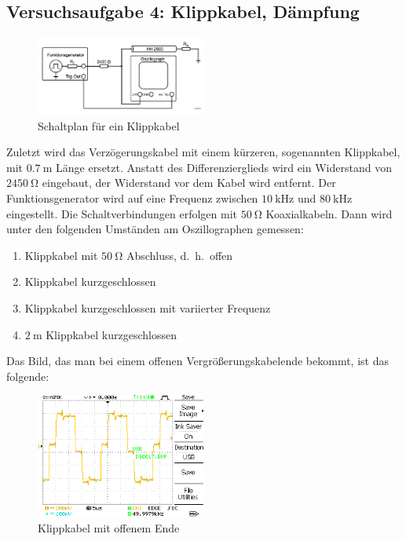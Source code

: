 \documentclass{article}
\begin{document}
\subsection{Versuchsaufgabe 4: Klippkabel, Dämpfung}
			\begin{figure}[H]
				\centering
				\includegraphics[width=0.5\textwidth]{figs/Aufbau_1_4_Klippkabel.png}
				\caption{Schaltplan für ein Klippkabel~\cite{anleitung}}
				\label{fig:aufbau_1_4_klippkabel}
			\end{figure}
			Zuletzt wird das Verzögerungskabel mit einem kürzeren, sogenannten Klippkabel, mit $\SI{0.7}{\meter}$ Länge ersetzt. Anstatt des Differenzierglieds wird ein Widerstand von $\SI{2450}{\ohm}$ eingebaut, der Widerstand vor dem Kabel wird entfernt. Der Funktionsgenerator wird auf eine Frequenz zwischen $\SI{10}{\kilo\hertz}$ und $\SI{80}{\kilo\hertz}$ eingestellt. Die Schaltverbindungen erfolgen mit $\SI{50}{\ohm}$ Koaxialkabeln. Dann wird unter den folgenden Umständen am Oszillographen gemessen:
			\begin{enumerate}[label=\alph*]
				\item Klippkabel mit $\SI{50}{\ohm}$ Abschluss, d.\ h.\ offen
				\item Klippkabel kurzgeschlossen
				\item Klippkabel kurzgeschlossen mit variierter Frequenz
				\item $\SI{2}{\meter}$ Klippkabel kurzgeschlossen 
			\end{enumerate}
Das Bild, das man bei einem offenen Vergrößerungskabelende bekommt, ist das folgende: 
				\begin{figure}[H]
					\centering
					\includegraphics[width=0.5\textwidth]{MesswerteVersuch1/DS0017.png}
					\caption{Klippkabel mit offenem Ende}
					\label{fig:DS0017}
				\end{figure}
\end{document}
